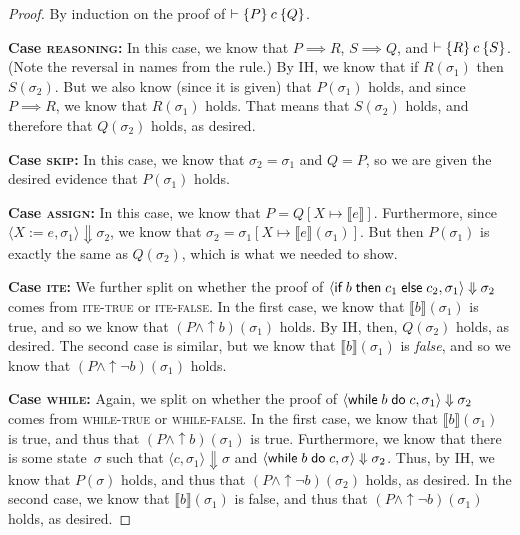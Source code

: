 \documentclass{lecturenotes}
\newcommand{\ite}[3]{\ensuremath{\textsf{if}\mkern5mu#1 \mathrel{\textsf{then}} #2 \mathrel{\textsf{else}} #3}}
\newcommand{\while}[2]{\ensuremath{\textsf{while}\mkern5mu#1 \mathrel{\textsf{do}} #2}}
\newcommand{\hoare}[3]{\ensuremath{\{#1\}\mkern4mu#2\mkern4mu\{#3\}}}
\begin{document}
\begin{proof}
  By induction on the proof of $\vdash \hoare{P}{c}{Q}$.

  \noindent\textbf{Case \textsc{reasoning}:}
  In this case, we know that $P \implies R$, $S \implies Q$, and $\vdash \hoare{R}{c}{S}$.
  (Note the reversal in names from the rule.)
  By IH, we know that if $R(\sigma_1)$ then $S(\sigma_2)$.
  But we also know (since it is given) that $P(\sigma_1)$ holds, and since $P \implies R$, we know that $R(\sigma_1)$ holds.
  That means that $S(\sigma_2)$ holds, and therefore that $Q(\sigma_2)$ holds, as desired.

  \noindent\textbf{Case \textsc{skip}:}
  In this case, we know that $\sigma_2 = \sigma_1$ and $Q = P$, so we are given the desired evidence that $P(\sigma_1)$ holds.

  \noindent\textbf{Case \textsc{assign}:}
  In this case, we know that $P = Q[X \mapsto \llbracket e \rrbracket]$.
  Furthermore, since $\langle X := e , \sigma_1 \rangle \Downarrow \sigma_2$, we know that $\sigma_2 = \sigma_1[X \mapsto \llbracket e \rrbracket(\sigma_1)]$.
  But then $P(\sigma_1)$ is exactly the same as $Q(\sigma_2)$, which is what we needed to show.

  \noindent\textbf{Case \textsc{ite}:}
  We further split on whether the proof of $\langle \ite{b}{c_1}{c_2}, \sigma_1\rangle\Downarrow \sigma_2$ comes from \textsc{ite-true} or \textsc{ite-false}.
  In the first case, we know that $\llbracket b \rrbracket(\sigma_1)$ is true, and so we know that $(P \land \uparrow b)(\sigma_1)$ holds.
  By IH, then, $Q(\sigma_2)$ holds, as desired.
  The second case is similar, but we know that $\llbracket b \rrbracket(\sigma_1)$ is \emph{false}, and so we know that $(P \land \uparrow\lnot b)(\sigma_1)$ holds.

  \noindent\textbf{Case \textsc{while}:}
  Again, we split on whether the proof of $\langle \while{b}{c}, \sigma_1 \rangle \Downarrow \sigma_2$ comes from \textsc{while-true} or \textsc{while-false}.
  In the first case, we know that $\llbracket b \rrbracket(\sigma_1)$ is true, and thus that $(P \land \uparrow b)(\sigma_1)$ is true.
  Furthermore, we know that there is some state~$\sigma$ such that $\langle c, \sigma_1 \rangle \Downarrow \sigma$ and $\langle \while{b}{c}, \sigma\rangle \Downarrow \sigma_2$.
  Thus, by IH, we know that $P(\sigma)$ holds, and thus that $(P \land \uparrow\lnot b)(\sigma_2)$ holds, as desired.
  In the second case, we know that $\llbracket b \rrbracket(\sigma_1)$ is false, and thus that $(P\land\uparrow\lnot b)(\sigma_1)$ holds, as desired.
\end{proof}
\end{document}
